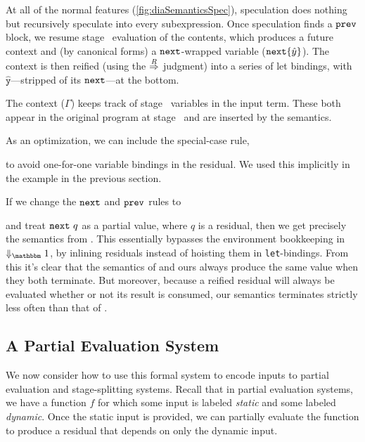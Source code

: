 At all of the normal features (\ref{fig:diaSemanticsSpec}), speculation does
nothing but recursively speculate into every subexpression.  Once speculation
finds a $\prev$ block, we resume stage \bbone\ evaluation of the contents, which
produces a future context and (by canonical forms) a $\next$-wrapped variable
($\next\{\hat y\}$).  The context is then reified (using the $\reifysym$
judgment) into a series of let bindings, with $\mathtt{\hat y}$---stripped of
its $\next$---at the bottom.

The context ($\Gamma$) keeps track of stage \bbtwo\ variables in the input term. 
These both appear in the original program at stage \bbtwo\ and are inserted by the semantics.

As an optimization, we can include the special-case rule,
\begin{mathpar}
\end{mathpar}
to avoid one-for-one variable bindings in the residual.
We used this implicitly in the example in the previous section.

If we change the $\next$ and $\prev$ rules to 
and treat $\next~q$ as a partial value, where $q$ is a residual,
then we get precisely the semantics from \cite{davies96}. This essentially bypasses the
environment bookkeeping in $\redonesym$, by inlining residuals instead of
hoisting them in \verb|let|-bindings.
From this it's clear that the semantics of \cite{davies96} and ours always produce the same value when they both terminate.
But moreover, because a reified residual will always be evaluated whether or not its result is consumed, 
our semantics terminates strictly less often than that of \cite{davies96}.

\subsection {A Partial Evaluation System}

We now consider how to use this formal system to encode inputs to partial evaluation and stage-splitting systems.
Recall that in partial evaluation systems, we have a function $f$ for which some input is labeled {\em static} and 
some labeled {\em dynamic}.  Once the static input is provided, we can partially evaluate the function to produce
a residual that depends on only the dynamic input.

